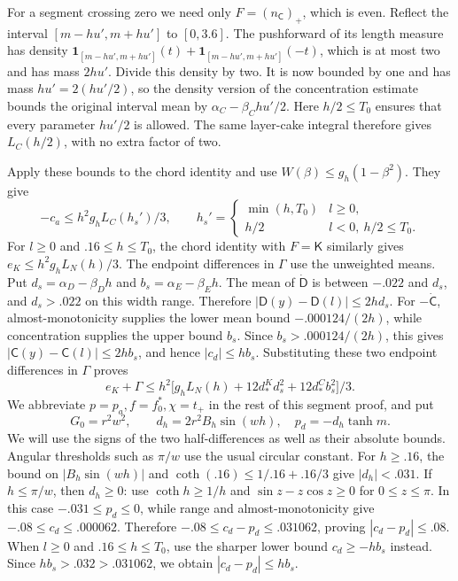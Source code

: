 For a segment crossing zero we need only $F=(n_{\mathsf C})_+$,
which is even. Reflect the interval $[m-hu',m+hu']$ to $[0,3.6]$.
The pushforward of its length measure has density
$\mathbf1_{[m-hu',m+hu']}(t)+
\mathbf1_{[m-hu',m+hu']}(-t)$, which is at most two and has
mass $2hu'$. Divide this density by two. It is now bounded by one
and has mass $hu'=2(hu'/2)$, so the density version of the
concentration estimate bounds the original interval mean by
$\alpha_C-\beta_Chu'/2$.
Here $h/2\le T_0$ ensures that every parameter $hu'/2$ is allowed.
The same layer-cake integral therefore gives $L_C(h/2)$, with no
extra factor of two.

Apply these bounds to the chord identity and use
$W(\beta)\le g_h(1-\beta^2)$. They give
\[
 -c_a\le h^2 g_h L_C(h_s')/3,\qquad
 h_s'=\begin{cases}\min(h,T_0)& l\ge0,\\ h/2&l<0,\ h/2\le T_0.\end{cases}                 \tag{s2}\label{eq:s2}
\]
For $l\ge0$ and $.16\le h\le T_0$, the chord identity with
$F=\mathsf K$ similarly gives
$e_K\le h^2g_hL_N(h)/3$.
The endpoint differences in $\Gamma$ use the unweighted means.
Put $d_s=\alpha_D-\beta_Dh$ and $b_s=\alpha_E-\beta_Eh$.
The mean of $\dot{\mathsf D}$ is between $-.022$ and $d_s$,
and $d_s>.022$ on this width range. Therefore
$|\mathsf D(y)-\mathsf D(l)|\le2hd_s$.
For $-\dot{\mathsf C}$, almost-monotonicity supplies the lower
mean bound $-.000124/(2h)$, while concentration supplies the upper
bound $b_s$. Since $b_s>.000124/(2h)$, this gives
$|\mathsf C(y)-\mathsf C(l)|\le2hb_s$, and hence $|c_d|\le hb_s$.
Substituting these two endpoint differences in $\Gamma$ proves
\[
 e_K+\Gamma\le h^2\big[g_h L_N(h)+12d_*^K d_s^2+12d_*^C b_s^2\big]/3.                \tag{s3}\label{eq:s3}
\]
We abbreviate \(p=p_a, f=f_0^*, \chi=t_+\) in the rest of this segment proof, and put
\[
 G_0=r^2w^2,\qquad d_h=2r^2 B_h\sin(wh),\quad p_d=-d_h\tanh m.
\]
We will use the signs of the two half-differences as well as their
absolute bounds. Angular thresholds such as $\pi/w$ use the usual
circular constant. For $h\ge.16$, the bound on $|B_h\sin(wh)|$
and $\coth(.16)\le1/.16+.16/3$ give $|d_h|<.031$.
If $h\le\pi/w$, then $d_h\ge0$: use $\coth h\ge1/h$ and
$\sin z-z\cos z\ge0$ for $0\le z\le\pi$.
In this case $-.031\le p_d\le0$, while range and almost-monotonicity give
$-.08\le c_d\le.000062$. Therefore
$-.08\le c_d-p_d\le.031062$, proving $|c_d-p_d|\le.08$.
When $l\ge0$ and $.16\le h\le T_0$, use the sharper lower
bound $c_d\ge-hb_s$ instead. Since $hb_s>.032>.031062$,
we obtain $|c_d-p_d|\le hb_s$.

